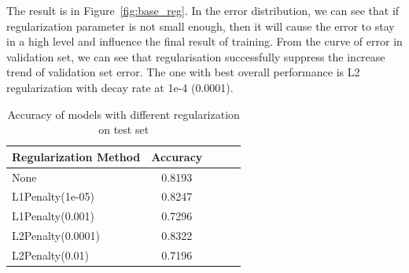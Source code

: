 \documentclass{article}
\begin{document}
The result is in Figure~\ref{fig:base_reg}. In the error distribution, we can see that if regularization parameter is not small enough, then it will cause the error to stay in a high level and influence the final result of training.  From the curve of error in validation set, we can see that regularisation successfully suppress the increase trend of validation set error. The one with best overall performance is L2 regularization with decay rate at 1e-4 (0.0001).


\begin{table}[tb]
\vskip 3mm
\begin{center}
\begin{small}
\begin{sc}
\begin{tabular}{lcccr}
\hline
\abovespace\belowspace
Regularization Method & Accuracy \\
\hline
\abovespace
None					& 0.8193		\\
L1Penalty(1e-05)    	& 0.8247 	\\
L1Penalty(0.001)	 	& 0.7296 	\\
L2Penalty(0.0001)		& 0.8322  	\\
L2Penalty(0.01)	  		& 0.7196 	\\


\hline
\end{tabular}
\end{sc}
\end{small}
\caption{Accuracy of models with different regularization on test set}
\label{tab:reg}
\end{center}
\vskip -3mm
\end{table}
\end{document}
